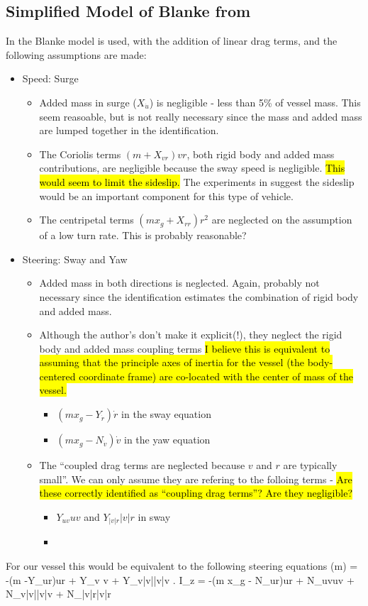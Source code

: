 \documentclass[11pt,draftcls,journal,onecolumn]{../latexlib/latex_ieee/IEEEtran}
\begin{document}
\subsection{Simplified Model of Blanke from \cite{caccia08practical}}
In \cite{caccia08practical} the Blanke model is used, with the addition of linear drag terms, and the following assumptions are made:
\begin{itemize}
\item Speed: Surge
  \begin{itemize}
  \item Added mass in surge ($X_{\dot{u}}$) is negligible - less than 5\% of vessel mass.  This seem reasoable, but is not really necessary since the mass and added mass are lumped together in the identification.
  \item The Coriolis terms $(m+X_{vr})vr$, both rigid body and added mass contributions, are negligible because the sway speed is negligible.  \hl{This would seem to limit the sideslip.}  The experiments in \cite{sonnenburg10control}suggest the sideslip would be an important component for this type of vehicle.
  \item The centripetal terms $(mx_g+X_{rr})r^2$ are neglected on the assumption of a low turn rate.  This is probably reasonable?
  \end{itemize}
\item Steering: Sway and Yaw
  \begin{itemize}
  \item Added mass in both directions is neglected.  Again, probably not necessary since the identification estimates the combination of rigid body and added mass.
  \item Although the author's don't make it explicit(!), they neglect the rigid body and added mass coupling terms  \hl{I believe this is equivalent to assuming that the principle axes of inertia for the vessel (the body-centered coordinate frame) are co-located with the center of mass of the vessel.}
    \begin{itemize}
    \item $(m x_g - Y_{\dot{r}})\dot{r}$ in the sway equation
    \item $(m x_g - N_{\dot{v}})\dot{v}$ in the yaw equation
    \end{itemize}
  \item The ``coupled drag terms are neglected because $v$ and $r$ are typically small''.  We can only assume they are refering to the folloing terms - \hl{Are these correctly identified as ``coupling drag terms''?  Are they negligible?}
    \begin{itemize}
    \item $Y_{uv}uv$ and $Y_{|v|r}|v|r$ in sway
    \item 
    \end{itemize}
  \end{itemize}
\end{itemize}
For our vessel this would be equivalent to the following steering equations
\beqn
(m) 
=
-(m -Y_{ur})ur + Y_v v + Y_{v|v|}|v|v .
\label{e:blanke2v}
\eeqn
\beqn
I_z
=
-(m x_g - N_{ur})ur + N_{uv}uv + N_{v|v|}|v|v + N_{|v|r}|v|r
\label{e:blanke2r}
\eeqn
\end{document}
